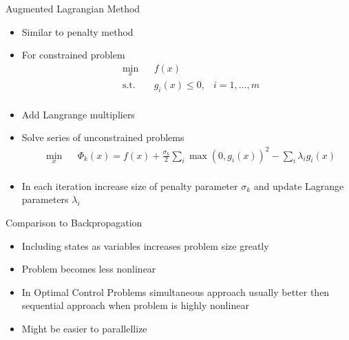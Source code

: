 \documentclass[11pt,t]{beamer}
\begin{document}
\begin{frame}{Augmented Lagrangian Method}
   \begin{itemize}
      \item Similar to penalty method
      \item For constrained problem
      \begin{equation*}
      \begin{aligned}
      & \underset{x}{\text{min}}
      & & f(x) \\
      & \text{s.t.}
      & & g_i(x) \leq 0, & i = 1,\ldots,m \\
      \end{aligned}
      \end{equation*}
      \item Add Langrange multipliers
      \item Solve series of unconstrained problems
      \begin{equation*}
      \begin{aligned}
      & \underset{x}{\text{min}} 
      & & \Phi_k(x) = f(x) + \frac{\sigma_k}{2} \sum\limits_{i} \max(0,g_i(x))^2 - \sum\limits_{i}\lambda_ig_i(x)   \\
      \end{aligned}
      \end{equation*}
      \item In each iteration increase size of penalty parameter $\sigma_k$ and update Lagrange parameters $\lambda_i$
      
   \end{itemize}
\end{frame}

\begin{frame}{Comparison to Backpropagation}
   \begin{itemize}
      \itemsep 15pt
      \item Including states as variables increases problem size greatly
      \item Problem becomes less nonlinear
      \item In Optimal Control Problems simultaneous approach usually better then sequential approach when problem is highly nonlinear
      \item Might be easier to parallellize
   \end{itemize}
\end{frame}
\end{document}
